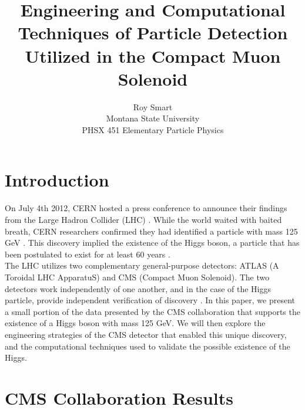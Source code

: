 \documentclass[12pt]{article}
\newcommand{\npar}{\\[0.5cm] \noindent}
\begin{document}
\title{Engineering and Computational Techniques of Particle Detection Utilized in the Compact Muon Solenoid}
\author{Roy Smart \\ Montana State University \\PHSX 451 Elementary Particle Physics}
\maketitle

\section{Introduction}
On July 4th 2012, CERN hosted a press conference to announce their findings from the Large Hadron Collider (LHC) \cite{website:higgs_press}. While the world waited with baited breath, CERN researchers confirmed they had identified a particle with mass 125 GeV \cite{new_higgs}. This discovery implied the existence of the Higgs boson, a particle that has been postulated to exist for at least 60 years \cite{higgs_predict}. 
\npar
The LHC utilizes two complementary general-purpose detectors: ATLAS (A Toroidal LHC ApparatuS) and CMS (Compact Muon Solenoid). The two detectors work independently of one another, and in the case of the Higgs particle, provide independent verification of discovery \cite{lhc_combo}. In this paper, we present a small portion of the data presented by the CMS collaboration that supports the existence of a Higgs boson with mass 125 GeV. We will then explore the engineering strategies of the CMS detector that enabled this unique discovery, and the computational techniques used to validate the possible existence of the Higgs.


\section{CMS Collaboration Results}
\end{document}

